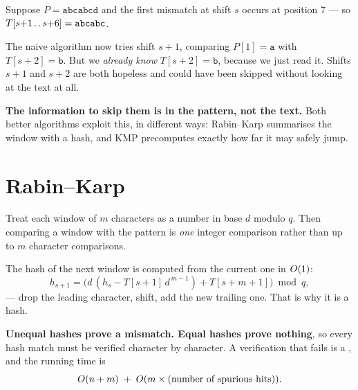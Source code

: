 
\begin{conceptbox}
Suppose $P = \texttt{abcabcd}$ and the first mismatch at shift $s$ occurs at
position 7 --- so $T[s{+}1 \mathinner{\ldotp\ldotp} s{+}6] = \texttt{abcabc}$.

\smallskip
The naive algorithm now tries shift $s+1$, comparing $P[1] = \texttt{a}$ with
$T[s{+}2] = \texttt{b}$. But we \emph{already know} $T[s+2] = \texttt{b}$,
because we just read it. Shifts $s+1$ and $s+2$ are both hopeless and could
have been skipped without looking at the text at all.

\smallskip
\textbf{The information to skip them is in the pattern, not the text.} Both
better algorithms exploit this, in different ways: Rabin--Karp summarises the
window with a hash, and KMP precomputes exactly how far it may safely jump.
\end{conceptbox}

\section{Rabin--Karp}

\begin{conceptbox}
Treat each window of $m$ characters as a number in base $d$ modulo $q$. Then
comparing a window with the pattern is \emph{one} integer comparison rather
than up to $m$ character comparisons.

\smallskip
The hash of the next window is computed from the current one in $O(1)$:
\[ h_{s+1} = \bigl(d\,(h_{s} - T[s{+}1]\,d^{\,m-1}) + T[s{+}m{+}1]\bigr)
   \bmod q, \]
--- drop the leading character, shift, add the new trailing one. That is why
it is a  hash.

\smallskip
\textbf{Unequal hashes prove a mismatch. Equal hashes prove nothing}, so every
hash match must be verified character by character. A verification that fails
is a , and the running time is
\[ O(n + m) \;+\; O(m \times (\text{number of spurious hits})). \]
\end{conceptbox}

